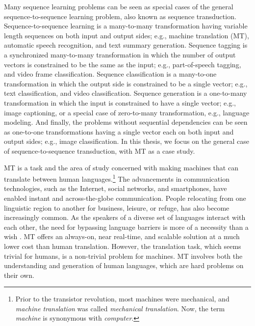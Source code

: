 Many sequence learning problems can be seen as special cases of the general sequence-to-sequence learning problem, also known as sequence transduction. Sequence-to-sequence learning is a many-to-many transformation having variable length sequences on both input and output sides; e.g., machine translation (MT), automatic speech recognition, and text summary generation.
Sequence tagging is a synchronized many-to-many transformation in which the number of output vectors is constrained to be the same as the input; e.g., part-of-speech tagging, and video frame classification.
Sequence classification is a many-to-one transformation in which the output side is constrained to be a single vector; e.g., text classification, and video classification.
Sequence generation is a one-to-many transformation in which the input is constrained to have a single vector; e.g., image captioning, or a special case of zero-to-many transformation, e.g., language modeling.
And finally, the problems without sequential dependencies can be seen as one-to-one transformations having a single vector each on both input and output sides; e.g., image classification. 
In this thesis, we focus on the general case of sequence-to-sequence transduction, with MT as a case study.

MT is a task and the area of study concerned with making machines that can translate between human languages.\footnote{Prior to the transistor revolution, most machines were mechanical, and \textit{machine translation} was called \textit{mechanical translation}.
Now, the term \textit{machine} is synonymous with \textit{computer}.}
The advancements in communication technologies, such as the Internet, social networks, and smartphones, have enabled instant and across-the-globe communication.
People relocating from one linguistic region to another for business, leisure, or refuge, has also become increasingly common.
As the speakers of a diverse set of languages interact with each other, the need for bypassing language barriers is more of a necessity than a wish \cite{weaver1952translation}.
MT offers an always-on, near real-time, and scalable solution at a much lower cost than human translation.
However, the translation task, which seems trivial for humans, is a non-trivial problem for machines.
MT involves both the understanding and generation of human languages, which are hard problems on their own.

